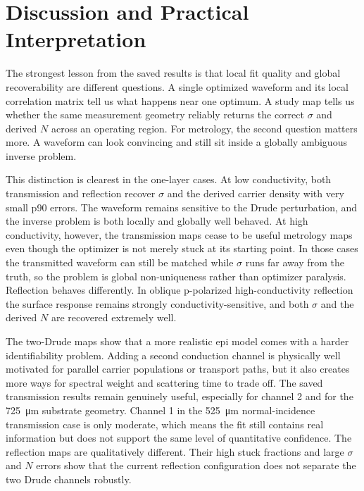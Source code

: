 \documentclass[11pt]{article}
\begin{document}
\section{Discussion and Practical Interpretation}

The strongest lesson from the saved results is that local fit quality and global recoverability are different questions. A single optimized waveform and its local correlation matrix tell us what happens near one optimum. A study map tells us whether the same measurement geometry reliably returns the correct \(\sigma\) and derived \(N\) across an operating region. For metrology, the second question matters more. A waveform can look convincing and still sit inside a globally ambiguous inverse problem.

This distinction is clearest in the one-layer cases. At low conductivity, both transmission and reflection recover \(\sigma\) and the derived carrier density with very small p90 errors. The waveform remains sensitive to the Drude perturbation, and the inverse problem is both locally and globally well behaved. At high conductivity, however, the transmission maps cease to be useful metrology maps even though the optimizer is not merely stuck at its starting point. In those cases the transmitted waveform can still be matched while \(\sigma\) runs far away from the truth, so the problem is global non-uniqueness rather than optimizer paralysis. Reflection behaves differently. In oblique p-polarized high-conductivity reflection the surface response remains strongly conductivity-sensitive, and both \(\sigma\) and the derived \(N\) are recovered extremely well.

The two-Drude maps show that a more realistic epi model comes with a harder identifiability problem. Adding a second conduction channel is physically well motivated for parallel carrier populations or transport paths, but it also creates more ways for spectral weight and scattering time to trade off. The saved transmission results remain genuinely useful, especially for channel 2 and for the \SI{725}{\micro\meter} substrate geometry. Channel 1 in the \SI{525}{\micro\meter} normal-incidence transmission case is only moderate, which means the fit still contains real information but does not support the same level of quantitative confidence. The reflection maps are qualitatively different. Their high stuck fractions and large \(\sigma\) and \(N\) errors show that the current reflection configuration does not separate the two Drude channels robustly.
\end{document}
